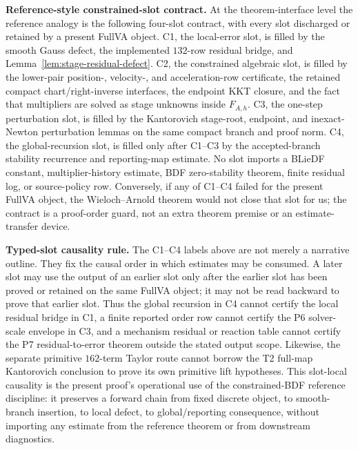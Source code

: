 \documentclass[preprint,12pt]{elsarticle}
\begin{document}
\noindent\textbf{Reference-style constrained-slot contract.}
At the theorem-interface level the reference analogy is the following
four-slot contract, with every slot discharged or retained by a present
FullVA object.  C1, the local-error slot, is filled by the smooth Gauss
defect, the implemented \(132\)-row residual bridge, and
Lemma~\ref{lem:stage-residual-defect}.  C2, the constrained algebraic slot,
is filled by the lower-pair position-, velocity-, and acceleration-row
certificate, the retained compact chart/right-inverse interfaces, the
endpoint KKT closure, and the fact that multipliers are solved as stage
unknowns inside \(F_{A,h}\).  C3, the one-step perturbation slot, is filled
by the Kantorovich stage-root, endpoint, and inexact-Newton perturbation
lemmas on the same compact branch and proof norm.  C4, the global-recursion
slot, is filled only after C1--C3 by the accepted-branch stability recurrence
and reporting-map estimate.  No slot imports a BLieDF constant,
multiplier-history estimate, BDF zero-stability theorem, finite residual log,
or source-policy row.  Conversely, if any of C1--C4 failed for the present
FullVA object, the Wieloch--Arnold theorem would not close that slot for us;
the contract is a proof-order guard, not an extra theorem premise or an
estimate-transfer device.

\noindent\textbf{Typed-slot causality rule.}
The C1--C4 labels above are not merely a narrative outline.  They fix the
causal order in which estimates may be consumed.  A later slot may use the
output of an earlier slot only after the earlier slot has been proved or
retained on the same FullVA object; it may not be read backward to prove that
earlier slot.  Thus the global recursion in C4 cannot certify the local
residual bridge in C1, a finite reported order row cannot certify the P6
solver-scale envelope in C3, and a mechanism residual or reaction table cannot
certify the P7 residual-to-error theorem outside the stated output scope.
Likewise, the separate primitive \(162\)-term Taylor route cannot borrow the
T2 full-map Kantorovich conclusion to prove its own primitive lift
hypotheses.  This slot-local causality is the present proof's operational
use of the constrained-BDF reference discipline: it preserves a forward
chain from fixed discrete object, to smooth-branch insertion, to local defect,
to global/reporting consequence, without importing any estimate from the
reference theorem or from downstream diagnostics.
\end{document}
